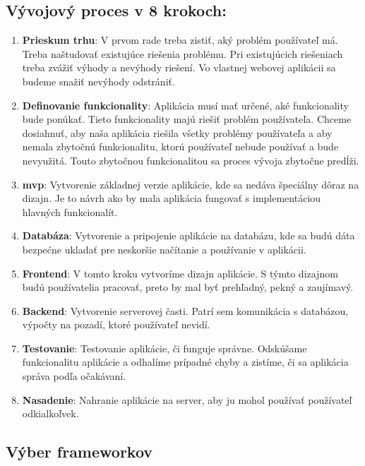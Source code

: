 \subsection{Vývojový proces v 8 krokoch:}
\begin{enumerate}
    \item \textbf{Prieskum trhu}: V prvom rade treba zistiť, aký problém používateľ má. Treba naštudovať existujúce riešenia problému. Pri existujúcich riešeniach treba zvážiť výhody a nevýhody riešení. Vo vlastnej webovej aplikácii sa budeme snažiť nevýhody odstrániť.
    \item \textbf{Definovanie funkcionality}: Aplikácia musí mať určené, aké funkcionality bude ponúkať. Tieto funkcionality majú riešiť problém používateľa. Chceme dosiahnuť, aby naša aplikácia riešila všetky problémy používateľa a aby nemala zbytočnú funkcionalitu, ktorú používateľ nebude používať a bude nevyužitá. Touto zbytočnou funkcionalitou sa proces vývoja zbytočne predĺži. 
    \item  \textbf{\acrshort{mvp}}: Vytvorenie základnej verzie aplikácie, kde sa nedáva špeciálny dôraz na dizajn. Je to návrh ako by mala aplikácia fungovať s implementáciou hlavných funkcionalít.
    \item \textbf{Databáza}: Vytvorenie a pripojenie aplikácie na databázu, kde sa budú dáta bezpećne ukladať pre neskoršie načítanie a používanie v aplikácii.
    \item \textbf{Frontend}: V tomto kroku vytvoríme dizajn aplikácie. S týmto dizajnom budú používatelia pracovať, preto by mal byť prehľadný, pekný a zaujímavý.
    \item \textbf{Backend}: Vytvorenie serverovej časti. Patrí sem komunikácia s databázou, výpočty na pozadí, ktoré používateľ nevidí.
    \item \textbf{Testovanie}: Testovanie aplikácie, či funguje správne. Odskúšame funkcionalitu aplikácie a odhalíme prípadné chyby a zistíme, či sa aplikácia správa podľa očakávaní.
    \item \textbf{Nasadenie}: Nahranie aplikácie na server, aby ju mohol používať používateľ odkialkoľvek.
\end{enumerate}
\subsection{Výber frameworkov}